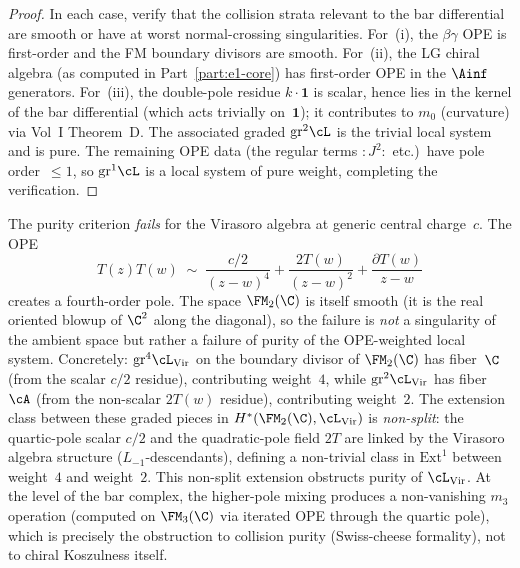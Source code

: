 \begin{proof}
In each case, verify that the collision strata relevant to the bar
differential are smooth or have at worst normal-crossing
singularities. For~(i), the $\beta\gamma$ OPE is first-order and
the FM boundary divisors are smooth. For~(ii), the LG chiral
algebra (as computed in Part~\ref{part:e1-core}) has first-order OPE in the
$\Ainf$ generators. For~(iii), the double-pole residue $k \cdot \mathbf{1}$ is scalar,
hence lies in the kernel of the bar differential (which acts
trivially on~$\mathbf{1}$); it contributes to $m_0$ (curvature)
via Vol~I Theorem~D. The associated graded $\mathrm{gr}^2\cL$
is the trivial local system and is pure. The remaining OPE data
(the regular terms $:J^2:$ etc.)\ have pole order~$\leq 1$,
so $\mathrm{gr}^1\cL$ is a local system of pure weight, completing
the verification.
\end{proof}

\begin{proposition}
\label{prop:purity-failure-virasoro}
The purity criterion \emph{fails} for the Virasoro algebra at
generic central charge~$c$. The OPE
\[
T(z)T(w) \;\sim\; \frac{c/2}{(z-w)^4} +
\frac{2T(w)}{(z-w)^2} + \frac{\partial T(w)}{z-w}
\]
creates a fourth-order pole. The space $\FM_2(\C)$ is itself
smooth (it is the real oriented blowup of $\C^2$ along the
diagonal), so the failure is \emph{not} a singularity of the
ambient space but rather a failure of purity of the OPE-weighted
local system. Concretely: $\mathrm{gr}^4\cL_{\mathrm{Vir}}$
on the boundary divisor of $\FM_2(\C)$ has fiber~$\C$
(from the scalar $c/2$ residue), contributing weight~$4$, while
$\mathrm{gr}^2\cL_{\mathrm{Vir}}$ has fiber~$\cA$ (from the
non-scalar $2T(w)$ residue), contributing weight~$2$. The
extension class between these graded pieces in
$H^*(\FM_2(\C), \cL_{\mathrm{Vir}})$ is \emph{non-split}: the
quartic-pole scalar $c/2$ and the quadratic-pole field $2T$
are linked by the Virasoro algebra structure ($L_{-1}$-descendants),
defining a non-trivial class in $\mathrm{Ext}^1$ between weight~$4$
and weight~$2$. This non-split extension obstructs purity of
$\cL_{\mathrm{Vir}}$. At the level of the bar complex,
the higher-pole mixing produces a non-vanishing $m_3$ operation
(computed on $\FM_3(\C)$ via iterated OPE through the quartic
pole), which is precisely the obstruction to collision purity
(Swiss-cheese formality), not to chiral Koszulness itself.
\end{proposition}

